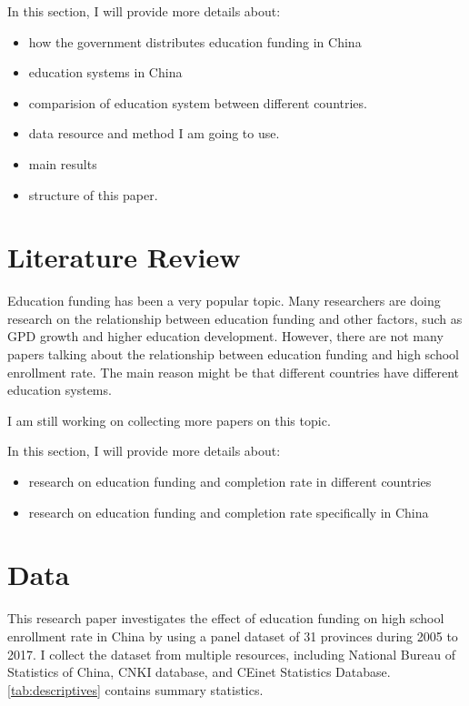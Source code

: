 \documentclass[12pt,english]{article}
\begin{document}
In this section, I will provide more details about:
	     \begin{itemize} 
	           \item how the government distributes education funding in China
        	   \item education systems in China
        	   \item comparision of education system between different countries.
        	   \item data resource and method I am going to use.
        	   \item main results
        	   \item structure of this paper.
         \end{itemize}

\section{Literature Review}\label{sec:litreview}
Education funding has been a very popular topic. Many researchers are doing research on the relationship between education funding and other factors, such as GPD growth and higher education development. However, there are not many papers talking about the relationship between education funding and high school enrollment rate. The main reason might be that different countries have different education systems. 

I am still working on collecting more papers on this topic.

In this section, I will provide more details about:
	     \begin{itemize} 
	           \item research on education funding and completion rate in different countries
	           \item research on education funding and completion rate specifically in China
         \end{itemize} 



\section{Data}\label{sec:data}
This research paper investigates the effect of education funding on high school enrollment rate in China by using a panel dataset of 31 provinces during 2005 to 2017. I collect the dataset from multiple resources, including National Bureau of Statistics of China, CNKI database, and CEinet Statistics Database.  \ref{tab:descriptives} contains summary statistics.
\end{document}

